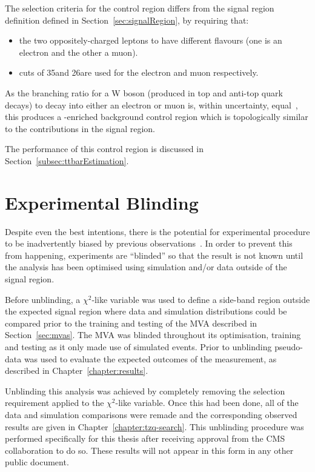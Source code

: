 The selection criteria for the \ttbar control region differs from the signal region definition defined in Section~\ref{sec:signalRegion}, by requiring that:
\begin{itemize}
\item the two oppositely-charged leptons to have different flavours (\ie one is an electron and the other a muon).
\item \pt cuts of 35\GeV and 26\GeV are used for the electron and muon respectively.%
\end{itemize} 

As the branching ratio for a W boson (produced in top and anti-top quark decays) to decay into either an electron or muon is, within uncertainty, equal~\cite{Tanabashi:2018oca}, this produces a \ttbar-enriched background control region which is topologically similar to the \ttbar contributions in the signal region. 

The performance of this control region is discussed in Section~\ref{subsec:ttbarEstimation}.

\section{Experimental Blinding}\label{sec:blinding}
Despite even the best intentions, there is the potential for experimental procedure to be inadvertently biased by previous observations~\cite{Roodman:2003rw}.
In order to prevent this from happening, experiments are ``blinded'' so that the result is not known until the analysis has been optimised using simulation and/or data outside of the signal region.

Before unblinding, a $\chi^{2}$-like variable was used to define a side-band region outside the expected signal region where data and simulation distributions could be compared prior to the training and testing of the MVA described in Section~\ref{sec:mvas}.
The MVA was blinded throughout its optimisation, training and testing as it only made use of simulated events.
Prior to unblinding pseudo-data was used to evaluate the expected outcomes of the measurement, as described in Chapter~\ref{chapter:results}.

Unblinding this analysis was achieved by completely removing the selection requirement applied to the $\chi^{2}$-like variable.
Once this had been done, all of the data and simulation comparisons were remade and the corresponding observed results are given in Chapter~\ref{chapter:tzq-search}.
This unblinding procedure was performed specifically for this thesis after receiving approval from the CMS collaboration to do so.
These results will not appear in this form in any other public document.

